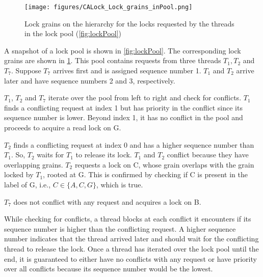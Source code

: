 \begin{figure}
	\centering
	\captionsetup{justification=centering}
	\texttt{[image: figures/CALock\_Lock\_grains\_inPool.png]}
	\caption{Lock grains on the hierarchy for the locks requested by the threads in the lock pool (\cref{fig:lockPool})}
	\label{fig:lockGrainsOnHierarchy}
\end{figure}

A snapshot of a lock pool is shown in \cref{fig:lockPool}. The corresponding lock grains are shown in  \cref{fig:lockGrainsOnHierarchy}. This pool contains requests from three threads $T_1, T_2$ and $T_7$. Suppose $T_7$ arrives first and is assigned sequence number 1. $T_1$ and $T_2$ arrive later and have sequence numbers 2 and 3, respectively. 

$T_1$, $T_2$ and $T_7$ iterate over the pool from left to right and check for conflicts. $T_1$ finds a conflicting request at index 1 but has priority in the conflict since its sequence number is lower. Beyond index 1, it has no conflict in the pool and proceeds to acquire a read lock on G.

$T_2$ finds a conflicting request at index 0 and has a higher sequence number than $T_1$. So, $T_2$ waits for $T_1$ to release its lock. $T_1$ and $T_2$ conflict because they have overlapping grains. $T_2$ requests a lock on C, whose grain overlaps with the grain locked by $T_1$, rooted at G. This is confirmed by checking if C is present in the label of G, i.e., $C \in \{A, C, G\}$, which is true.

$T_7$ does not conflict with any request and acquires a lock on B.



While checking for conflicts, a thread blocks at each conflict it encounters if its sequence number is higher than the conflicting request. A higher sequence number indicates that the thread arrived later and should wait for the conflicting thread to release the lock. 
Once a thread has iterated over the lock pool until the end, it is guaranteed to either have no conflicts with any request or have priority over all conflicts because its sequence number would be the lowest. 




